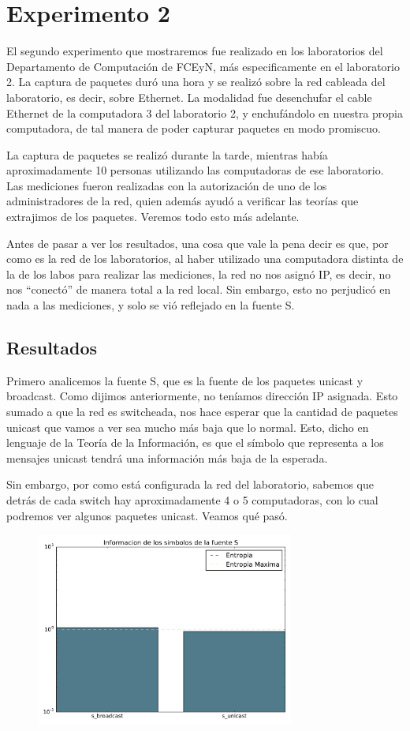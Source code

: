 \section{Experimento 2}

El segundo experimento que mostraremos fue realizado en los laboratorios del Departamento de Computación de FCEyN, más especificamente en el laboratorio 2.
La captura de paquetes duró una hora y se realizó sobre la red cableada del laboratorio, es decir, sobre Ethernet.
La modalidad fue desenchufar el cable Ethernet de la computadora 3 del laboratorio 2, y enchufándolo en nuestra propia computadora, de tal manera de poder capturar paquetes en modo promiscuo.

La captura de paquetes se realizó durante la tarde, mientras había aproximadamente 10 personas utilizando las computadoras de ese laboratorio. Las mediciones fueron realizadas con la autorización de uno de los administradores de la red, quien además ayudó a verificar las teorías que extrajimos de los paquetes. Veremos todo esto más adelante.

Antes de pasar a ver los resultados, una cosa que vale la pena decir es que, por como es la red de los laboratorios, al haber utilizado una computadora distinta de la de los labos para realizar las mediciones, la red no nos asignó IP, es decir, no nos ``conectó'' de manera total a la red local. Sin embargo, esto no perjudicó en nada a las mediciones, y solo se vió reflejado en la fuente S.


\subsection{Resultados}

Primero analicemos la fuente S, que es la fuente de los paquetes unicast y broadcast. Como dijimos anteriormente, no teníamos dirección IP asignada. Esto sumado a que la red es switcheada, nos hace esperar que la cantidad de paquetes unicast que vamos a ver sea mucho más baja que lo normal. Esto, dicho en lenguaje de la Teoría de la Información, es que el símbolo que representa a los mensajes unicast tendrá una información más baja de la esperada.

Sin embargo, por como está configurada la red del laboratorio, sabemos que detrás de cada switch hay aproximadamente 4 o 5 computadoras, con lo cual podremos ver algunos paquetes unicast. Veamos qu\'e pasó.

\begin{figure}[H]
  \centering
  \includegraphics[width=8.5cm]{exp_labo/grafico1.pdf}
  \caption{\normalfont }
\end{figure}


